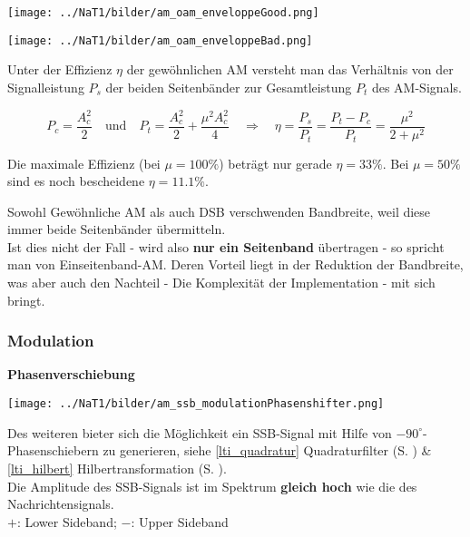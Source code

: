 \begin{minipage}[t][2.3cm][c]{9.5cm}
	\begin{center}
      \texttt{[image: ../NaT1/bilder/am\_oam\_enveloppeGood.png]}
	\end{center}
\end{minipage}
\begin{minipage}[t][2.3cm][c]{9.5cm}
    \begin{center}
    	\texttt{[image: ../NaT1/bilder/am\_oam\_enveloppeBad.png]}
	\end{center}
\end{minipage}

Unter der Effizienz $ \eta $ der gewöhnlichen AM versteht man das Verhältnis von der Signalleistung
$P_s$ der beiden Seitenbänder zur Gesamtleistung $P_t$ des AM-Signals.

$$ P_c = \frac{A_c^2}{2} \quad \text{und} \quad P_t = \frac{A_c^2}{2} + \frac{\mu^2 A_c^2}{4}
\quad \Longrightarrow \quad \eta = \frac{P_s}{P_t} = \frac{P_t - P_c}{P_t} = \frac{\mu^2}{2+\mu^2} $$

Die maximale Effizienz (bei $\mu = 100\% $) beträgt nur gerade $ \eta = 33\% $. Bei $\mu = 50\% $
sind es noch bescheidene $\eta = 11.1\% $.


\newpage
{}
Sowohl Gewöhnliche AM als auch DSB verschwenden Bandbreite, weil diese immer beide Seitenbänder
übermitteln. \\
Ist dies nicht der Fall - wird also \textbf{nur ein Seitenband} übertragen - so spricht man von
Einseitenband-AM. Deren Vorteil liegt in der Reduktion der Bandbreite, was aber auch den Nachteil
- Die Komplexität der Implementation - mit sich bringt.

\subsubsection{Modulation}
\textbf{Phasenverschiebung }  \\
\begin{minipage}[t][3.7cm][c]{7.5cm}
    \texttt{[image: ../NaT1/bilder/am\_ssb\_modulationPhasenshifter.png]}
\end{minipage}
\begin{minipage}[t][3.7cm][c]{10.5cm}	
	Des weiteren bieter sich die Möglichkeit ein SSB-Signal mit Hilfe von 
	$ - 90^{\circ} $-Phasenschiebern zu generieren, {\small siehe
	\ref{lti_quadratur} Quadraturfilter (S. \pageref{lti_quadratur}) \&
	\ref{lti_hilbert} Hilbertransformation (S. \pageref{lti_hilbert})}.\\
	Die Amplitude des SSB-Signals ist im Spektrum \textbf{gleich hoch} wie die des
	Nachrichtensignals.\\ 
	$+$: Lower Sideband; \qquad $-$: Upper Sideband
\end{minipage}

